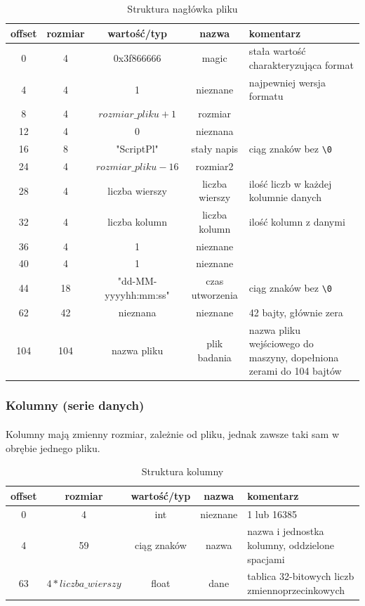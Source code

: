 \documentclass[12pt]{report}
\begin{document}
	\begin{table}[H]
		\centering
		\caption{Struktura nagłówka pliku}
		\begin{tabular}{|c|c|c|c|p{5.5cm}|} \hline
			offset & rozmiar & wartość/typ & nazwa & komentarz \\\hline
			\hline
			0 &  4 & 0x3f866666 & magic & stała wartość charakteryzująca format \\\hline
			4 &  4 & 1 & nieznane & najpewniej wersja formatu \\\hline
			8 &  4 & $rozmiar\_pliku + 1$ & rozmiar & \\\hline
			12 &  4 & 0 & nieznana &  \\\hline
			16 &  8 & "ScriptPl" & stały napis & ciąg znaków bez \verb|\0| \\\hline
			24 &  4 & $rozmiar\_pliku - 16$ & rozmiar2 &  \\\hline
			28 &  4 & liczba wierszy & liczba wierszy & ilość liczb w każdej kolumnie danych \\\hline
			32 &  4 & liczba kolumn & liczba kolumn & ilość kolumn z danymi \\\hline
			36 &  4 & 1 & nieznane & \\\hline
			40 &  4 & 1 & nieznane & \\\hline
			44 & 18 & "dd-MM-yyyyhh:mm:ss" & czas utworzenia & ciąg znaków bez \verb|\0| \\\hline
			62 & 42 & nieznana & nieznane & 42 bajty, głównie zera \\\hline
			104 & 104 & nazwa pliku & plik badania & nazwa pliku wejściowego do maszyny, dopełniona zerami do 104 bajtów \\\hline
		\end{tabular}
	\end{table}
	
	\pagebreak
	\subsubsection{Kolumny (serie danych)}
	\paragraph{}
	Kolumny mają zmienny rozmiar, zależnie od pliku, jednak zawsze taki sam w obrębie jednego pliku.
	
	\begin{table}[H]
		\centering
		\caption{Struktura kolumny}
		\begin{tabular}{|c|c|c|c|p{6.5cm}|} \hline
			offset & rozmiar & wartość/typ & nazwa & komentarz \\\hline
			\hline
			0 & 4 & int & nieznane & 1 lub 16385  \\\hline
			4 & 59 & ciąg znaków & nazwa & nazwa i jednostka kolumny, oddzielone spacjami \\\hline
			63 & $4 * liczba\_wierszy$ & float & dane & tablica 32-bitowych liczb zmiennoprzecinkowych \\\hline
		\end{tabular}
	\end{table}
	
\end{document}
